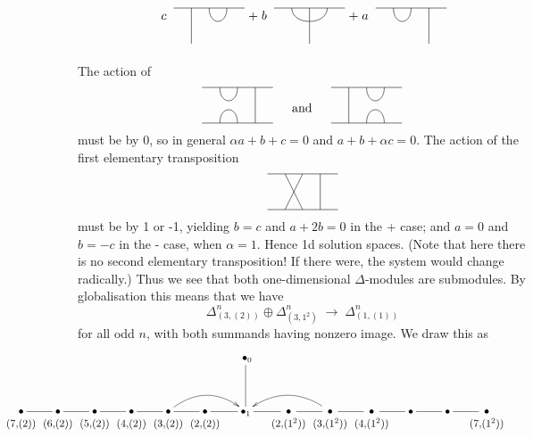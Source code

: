 \documentclass{article}
\theoremstyle{definition}
\newcommand{\xx}{\alpha}       %
\numberwithin{equation}{subsection}
\begin{document}
\[ 
\rb{c\;} \begin{tikzpicture}
     \draw (0,0) -- (2,0) ;
     \draw (.5,0) -- (.5,-1);
     \draw (1,0) .. controls (1,-.5) and (1.5,-.5) .. (1.5,0) ;
 \end{tikzpicture}
 \rb{+\;b\;} \begin{tikzpicture}
     \draw (0,0) -- (2,0) ;
     \draw (1,0) -- (1,-1);
     \draw (.5,0) .. controls (.5,-.5) and (1.5,-.5) .. (1.5,0) ;
 \end{tikzpicture}
 \rb{+\;a\;} \begin{tikzpicture}
     \draw (0,0) -- (2,0) ;
     \draw (1.5,0) -- (1.5,-1);
     \draw (.5,0) .. controls (.5,-.5) and (1.0,-.5) .. (1,0) ;
 \end{tikzpicture}
\]
\medskip \medskip 


\noindent 
The action of 
\[
\UI \;\;\;\mbox{ and } \;\;\;  \IU 
\]
must be by 0, so in general 
$\xx a+b+c=0$ and $a+b+\xx c=0$. 
The action of the first elementary transposition
\[
\SigI  
\]
must be by 1 or -1, yielding $b=c$ and $a+2b=0$ in the + case; and $a=0$ and $b=-c$ in the - case, when $\xx=1$. Hence 1d solution spaces. 
(Note that here there is no second elementary transposition! If there were, the system would change radically.)
Thus we see that both one-dimensional $\Delta$-modules are submodules. 
By globalisation this means that we have 
\[
\Delta^{n}_{(3,(2))} \oplus \Delta^{n}_{(3,1^2)} \; \rightarrow\; \Delta^{n}_{(1,(1))}
\]
for all odd $n$, with both summands having nonzero image. 
We draw this as
\[
\hspace{-2.1cm} 
\xymatrix{
   &&&&&& \;\bullet_0 \ar@{-}[d] \\
\ver{(7,\!(2))} \ar@{-}[r] & 
\ver{(6,\!(2))} \ar@{-}[r] & 
\ver{(5,\!(2))} \ar@{-}[r] & 
\ver{(4,\!(2))} \ar@{-}[r]  & 
\ver{(3,\!(2))} \ar@{-}[r] \ar@[red]@/^1.3pc/[rr] & 
\ver{(2,\!(2))} \ar@{-}[r] & 
\bullet_1 \ar@{-}[r] & 
\ver{(2,\!(1^2))} \ar@{-}[r] & 
\ver{(3,\!(1^2))} \ar@{-}[r] \ar@[red]@/_1.3pc/[ll] & 
\ver{(4,\!(1^2))} \ar@{-}[r] & 
\bullet \ar@{-}[r] & 
\bullet \ar@{-}[r] & 
\ver{(7,\!(1^2))} & 
}
\] 
\end{document}
